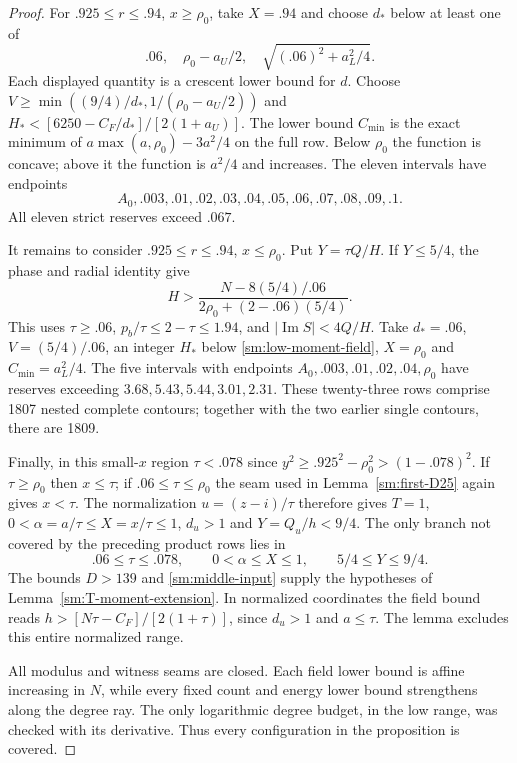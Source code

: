 \documentclass[11pt,reqno]{amsart}
\numberwithin{equation}{section}
\theoremstyle{definition}
\theoremstyle{remark}
\renewcommand{\Im}{\operatorname{Im}}
\begin{document}
\begin{proof}
For $.925\le r\le.94$, $x\ge\rho_0$, take $X=.94$ and choose
$d_*$ below at least one of
\[
 .06,\quad \rho_0-a_U/2,\quad \sqrt{(.06)^2+a_L^2/4}.
\]
Each displayed quantity is a crescent lower bound for $d$. Choose
$V\ge\min((9/4)/d_*,1/(\rho_0-a_U/2))$ and
$H_*<[6250-C_F/d_*]/[2(1+a_U)]$.
The lower bound $C_{\min}$ is the exact minimum of
$a\max(a,\rho_0)-3a^2/4$ on the full row. Below $\rho_0$
the function is concave; above it the function is $a^2/4$ and
increases. The eleven intervals have endpoints
\[
 A_0, .003, .01, .02, .03, .04, .05, .06, .07, .08, .09, .1.
\]
All eleven strict reserves exceed $.067$.

It remains to consider $.925\le r\le.94$, $x\le\rho_0$.
Put $Y=\tau Q/H$. If $Y\le5/4$, the phase and radial identity give
\begin{equation}\label{sm:low-moment-field}
 H>\frac{N-8(5/4)/.06}{2\rho_0+(2-.06)(5/4)}.
\end{equation}
This uses $\tau\ge.06$, $p_b/\tau\le2-\tau\le1.94$, and
$|\Im S|<4Q/H$.
Take $d_*=.06$, $V=(5/4)/.06$, an integer $H_*$ below
\eqref{sm:low-moment-field}, $X=\rho_0$ and $C_{\min}=a_L^2/4$.
The five intervals with endpoints
$A_0,.003,.01,.02,.04,\rho_0$ have reserves exceeding
$3.68,5.43,5.44,3.01,2.31$.
These twenty-three rows comprise 1807 nested complete contours;
together with the two earlier single contours, there are 1809.

Finally, in this small-$x$ region $\tau<.078$ since
$y^2\ge.925^2-\rho_0^2>(1-.078)^2$.
If $\tau\ge\rho_0$ then $x\le\tau$; if $.06\le\tau\le\rho_0$
the seam used in Lemma~\ref{sm:first-D25} again gives $x<\tau$.
The normalization $u=(z-i)/\tau$ therefore gives $T=1$,
$0<\alpha=a/\tau\le X=x/\tau\le1$, $d_u>1$ and
$Y=Q_u/h<9/4$. The only branch not covered by the preceding
product rows lies in
\[
 .06\le\tau\le.078,\qquad 0<\alpha\le X\le1,\qquad
 5/4\le Y\le9/4.
\]
The bounds $D>139$ and \eqref{sm:middle-input} supply the hypotheses
of Lemma~\ref{sm:T-moment-extension}. In normalized coordinates the
field bound reads $h>[N\tau-C_F]/[2(1+\tau)]$, since $d_u>1$
and $a\le\tau$. The lemma excludes this entire normalized range.

All modulus and witness seams are closed. Each field lower bound
is affine increasing in $N$, while every fixed count and energy
lower bound strengthens along the degree ray. The only logarithmic
degree budget, in the low range, was checked with its derivative.
Thus every configuration in the proposition is covered.
\end{proof}
\end{document}
